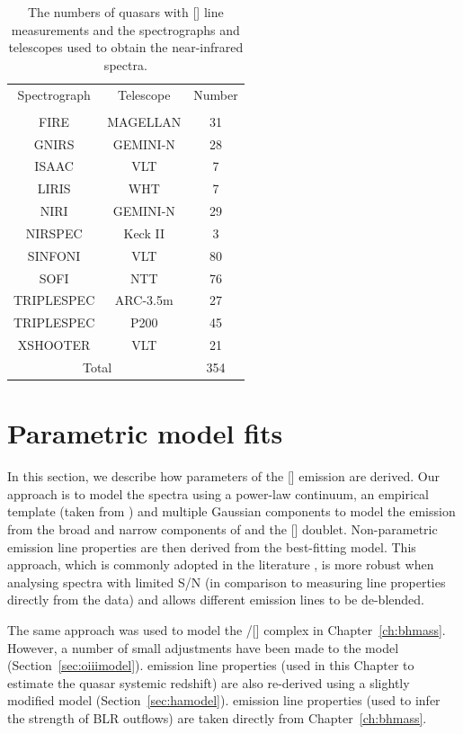 \begin{table}
  \centering
  \small 
  \caption{The numbers of quasars with [] line measurements and the spectrographs and telescopes used to obtain the near-infrared spectra.}
  \label{tab:specnums_ch4}
    \begin{tabular}{ccc} 
    \hline
    Spectrograph & Telescope & Number \\
                 &           & \\
    \hline
    FIRE         & MAGELLAN  & 31 \\
    GNIRS        & GEMINI-N  & 28 \\
    ISAAC        & VLT       & 7 \\
    LIRIS        & WHT       & 7 \\
    NIRI         & GEMINI-N  & 29 \\
    NIRSPEC      & Keck II   & 3 \\
    SINFONI      & VLT       & 80 \\
    SOFI         & NTT       & 76 \\
    TRIPLESPEC   & ARC-3.5m  & 27 \\
    TRIPLESPEC   & P200      & 45 \\
    XSHOOTER     & VLT       & 21 \\
    \hline
    \multicolumn{2}{c}{Total} & 354 \\
    \hline
    \end{tabular}
\end{table} 

\section{Parametric model fits}

In this section, we describe how parameters of the [] emission are derived. 
Our approach is to model the spectra using a power-law continuum, an empirical  template (taken from \citet{boroson92}) and multiple Gaussian components to model the emission from the broad and narrow components of \hb and the [] doublet.
Non-parametric emission line properties are then derived from the best-fitting model. 
This approach, which is commonly adopted in the literature \citep[e.g.][]{shen11,shen12,shen16a}, is more robust when analysing spectra with limited S/N (in comparison to measuring line properties directly from the data) and allows different emission lines to be de-blended.

The same approach was used to model the \hbns/[] complex in Chapter~\ref{ch:bhmass}. 
However, a number of small adjustments have been made to the model (Section~\ref{sec:oiiimodel}). 
\ha emission line properties (used in this Chapter to estimate the quasar systemic redshift) are also re-derived using a slightly modified model (Section~\ref{sec:hamodel}). 
 emission line properties (used to infer the strength of BLR outflows) are taken directly from Chapter~\ref{ch:bhmass}. 

